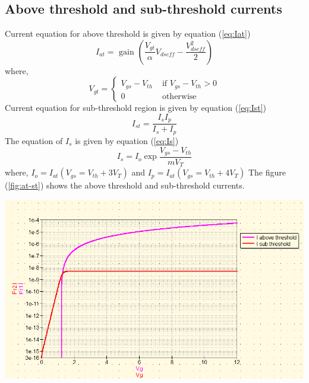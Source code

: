 \documentclass{article}
\begin{document}
\subsection{Above threshold and sub-threshold currents}
Current equation for above threshold is given by equation (\ref{eq:Iat})
\begin{equation}
    \label{eq:Iat}
    I_{at} = \text{ gain } (\frac{V_{gt}}{\alpha} V_{dseff} - \frac{V_{dseff}^2}{2})
\end{equation}
where,
$$V_{gt} = \begin{cases}
    V_{gs} - V_{th} &\text{ if } V_{gs} - V_{th} >0\\
    0 &\text{ otherwise }
\end{cases}$$
Current equation for sub-threshold region is given by equation (\ref{eq:Ist})
\begin{equation}
    \label{eq:Ist}
    I_{st} = \frac{I_{s}I_{p}}{I_{s}+I_{p}}
\end{equation}
The equation of $I_s$ is given by equation (\ref{eq:Is})
\begin{equation}
    \label{eq:Is}
    I_s = I_o \exp{\frac{V_{gs}-V_{th}}{m V_{T}}}
\end{equation}
where, $I_{o} = I_{at}(V_{gs} = V_{th} + 3V_T)$ and $I_{p} = I_{at}(V_{gs} = V_{th} + 4V_T) $
The figure (\ref{fig:at-st}) shows the above threshold and sub-threshold currents. 
\begin{center}
    \label{fig:at-st}
    \includegraphics[scale = 0.5]{../Images/22072024/Ids-at-st.png}
\end{center}
\newpage
\end{document}
